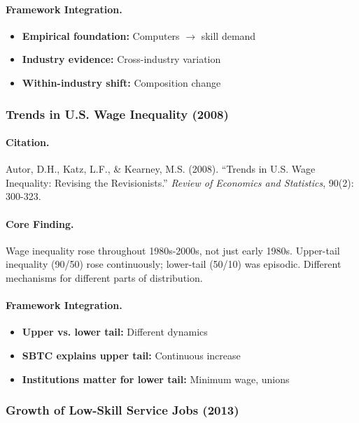 \paragraph{Framework Integration.}
\begin{itemize}
  \item \textbf{Empirical foundation:} Computers $\to$ skill demand
  \item \textbf{Industry evidence:} Cross-industry variation
  \item \textbf{Within-industry shift:} Composition change
\end{itemize}

\subsubsection{Trends in U.S. Wage Inequality (2008)}

\paragraph{Citation.}
Autor, D.H., Katz, L.F., \& Kearney, M.S. (2008). ``Trends in U.S.
Wage Inequality: Revising the Revisionists.''
\emph{Review of Economics and Statistics}, 90(2): 300-323.

\paragraph{Core Finding.}
Wage inequality rose throughout 1980s-2000s, not just early 1980s.
Upper-tail inequality (90/50) rose continuously; lower-tail (50/10)
was episodic. Different mechanisms for different parts of distribution.

\paragraph{Framework Integration.}
\begin{itemize}
  \item \textbf{Upper vs. lower tail:} Different dynamics
  \item \textbf{SBTC explains upper tail:} Continuous increase
  \item \textbf{Institutions matter for lower tail:} Minimum wage, unions
\end{itemize}

\subsubsection{Growth of Low-Skill Service Jobs (2013)}

